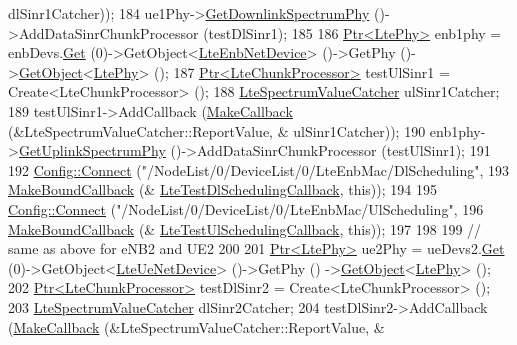 \begin{DoxyCode}
      dlSinr1Catcher));
184   ue1Phy->\hyperlink{classns3_1_1LtePhy_a9560f8862545c7c5760e7f6737c5b938}{GetDownlinkSpectrumPhy} ()->AddDataSinrChunkProcessor (testDlSinr1);
185 
186   \hyperlink{classns3_1_1Ptr}{Ptr<LtePhy>} enb1phy = enbDevs.\hyperlink{classns3_1_1NetDeviceContainer_a677d62594b5c9d2dea155cc5045f4d0b}{Get} (0)->GetObject<\hyperlink{classns3_1_1LteEnbNetDevice}{LteEnbNetDevice}> ()->GetPhy
       ()->\hyperlink{classns3_1_1Object_a13e18c00017096c8381eb651d5bd0783}{GetObject}<\hyperlink{classns3_1_1LtePhy}{LtePhy}> ();
187   \hyperlink{classns3_1_1Ptr}{Ptr<LteChunkProcessor>} testUlSinr1 = Create<LteChunkProcessor> ();
188   \hyperlink{classns3_1_1LteSpectrumValueCatcher}{LteSpectrumValueCatcher} ulSinr1Catcher;
189   testUlSinr1->AddCallback (\hyperlink{group__makecallbackmemptr_ga9376283685aa99d204048d6a4b7610a4}{MakeCallback} (&LteSpectrumValueCatcher::ReportValue, &
      ulSinr1Catcher));
190   enb1phy->\hyperlink{classns3_1_1LtePhy_aa17612c41d80653ed556431eedef4304}{GetUplinkSpectrumPhy} ()->AddDataSinrChunkProcessor (testUlSinr1);
191 
192   \hyperlink{group__config_ga4014f151241cd0939b6cb64409605736}{Config::Connect} (\textcolor{stringliteral}{"/NodeList/0/DeviceList/0/LteEnbMac/DlScheduling"},
193                    \hyperlink{group__makeboundcallback_ga1725d6362e6065faa0709f7c93f8d770}{MakeBoundCallback} (&
      \hyperlink{lte-test-interference_8cc_a8d6b465d93f1580062071ad34085009a}{LteTestDlSchedulingCallback}, \textcolor{keyword}{this}));
194 
195   \hyperlink{group__config_ga4014f151241cd0939b6cb64409605736}{Config::Connect} (\textcolor{stringliteral}{"/NodeList/0/DeviceList/0/LteEnbMac/UlScheduling"},
196                    \hyperlink{group__makeboundcallback_ga1725d6362e6065faa0709f7c93f8d770}{MakeBoundCallback} (&
      \hyperlink{lte-test-interference_8cc_a3af9ca9e1f1a2d5c2688b18891d5a9da}{LteTestUlSchedulingCallback}, \textcolor{keyword}{this}));
197 
198 
199   \textcolor{comment}{// same as above for eNB2 and UE2}
200 
201   \hyperlink{classns3_1_1Ptr}{Ptr<LtePhy>} ue2Phy = ueDevs2.\hyperlink{classns3_1_1NetDeviceContainer_a677d62594b5c9d2dea155cc5045f4d0b}{Get} (0)->GetObject<\hyperlink{classns3_1_1LteUeNetDevice}{LteUeNetDevice}> ()->GetPhy ()
      ->\hyperlink{classns3_1_1Object_a13e18c00017096c8381eb651d5bd0783}{GetObject}<\hyperlink{classns3_1_1LtePhy}{LtePhy}> ();
202   \hyperlink{classns3_1_1Ptr}{Ptr<LteChunkProcessor>} testDlSinr2 = Create<LteChunkProcessor> ();
203   \hyperlink{classns3_1_1LteSpectrumValueCatcher}{LteSpectrumValueCatcher} dlSinr2Catcher;
204   testDlSinr2->AddCallback (\hyperlink{group__makecallbackmemptr_ga9376283685aa99d204048d6a4b7610a4}{MakeCallback} (&LteSpectrumValueCatcher::ReportValue, &

\end{DoxyCode}
